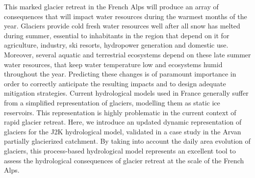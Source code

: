This marked glacier retreat in the French Alps will produce an array of consequences that will impact water resources during the warmest months of the year. Glaciers provide cold fresh water resources well after all snow has melted during summer, essential to inhabitants in the region that depend on it for agriculture, industry, ski resorts, hydropower generation and domestic use. Moreover, several aquatic and terrestrial ecosystems depend on these late summer water resources, that keep water temperature low and ecosystems humid throughout the year. Predicting these changes is of paramount importance in order to correctly anticipate the resulting impacts and to design adequate mitigation strategies. Current hydrological models used in France generally suffer from a simplified representation of glaciers, modelling them as static ice reservoirs. This representation is highly problematic in the current context of rapid glacier retreat. Here, we introduce an updated dynamic representation of glaciers for the J2K hydrological model, validated in a case study in the Arvan partially glacierized catchment. By taking into account the daily area evolution of glaciers, this process-based hydrological model represents an excellent tool to assess the hydrological consequences of glacier retreat at the scale of the French Alps. 